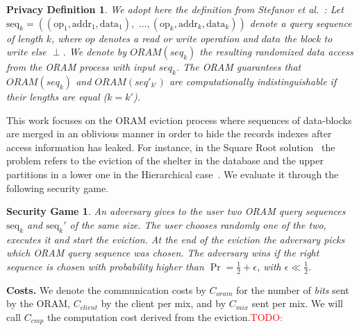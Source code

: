 \documentclass[USenglish,oneside,twocolumn]{article}
\newtheorem{privdef}{Privacy Definition}
\newtheorem*{secgme}{Security Game}
\newcommand{\todo}[1]{\textcolor{red}{TODO: #1}}
\begin{document}
\begin{privdef}\label{def:Oram}
We adopt here the definition from Stefanov et al.~\cite{stefanov2011towards}: Let $\text{seq}_k=((\text{op}_1, \text{addr}_1, \text{data}_1), \text{ ...},(\text{op}_k, \text{addr}_k, \text{data}_k))$ denote a query sequence of length $k$, where $op$ denotes a read or write operation and $data$ the block to write else $
\perp$.
We denote by $ORAM(seq_k)$ the resulting randomized data access from the ORAM process with input $seq_k$.
The ORAM guarantees that $ORAM(seq_k)$ and $ORAM(seq'_{k'})$ are computationally indistinguishable if their lengths are equal ($k=k'$).
\end{privdef}

This work focuses on the ORAM eviction process where sequences of data-blocks are merged in an oblivious manner in order to hide the records indexes after access information has leaked. For instance, in the Square Root solution~\cite{ostrovsky1990efficient} the problem refers to the eviction of the shelter in the database and the upper partitions in a lower one in the Hierarchical case~\cite{goldreich1996software}. We evaluate it through the following security game.
%

%
\begin{secgme}
An adversary gives to the user two ORAM query sequences $\text{seq}_k$ and $\text{seq}_k'$ of the same size. The user chooses randomly one of the two, executes it and start the eviction. At the end of the eviction the adversary picks which ORAM query sequence was chosen. The adversary wins if the right sequence is chosen with probability higher than $\Pr = \frac{1}{2}+\epsilon$, with $\epsilon\ll\frac{1}{2}$.
\label{def:Game}
\end{secgme} 
%

%
\noindent\textbf{Costs.} We denote the communication costs by $C_{oram}$ for the number of \emph{bits} sent by the ORAM, $C_{client}$ by the client per mix, and by $C_{mix}$ sent per mix. 
We will call $C_{cmp}$ the computation cost derived from the eviction.\todo{}
%
\end{document}
